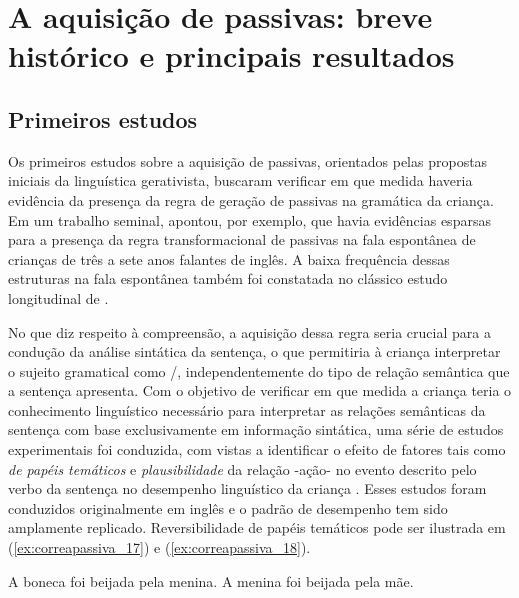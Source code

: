 \documentclass[output=paper]{LSP/langsci}
\begin{document}
\section{A aquisição de passivas: breve histórico e principais resultados}
\label{sec:correapassiva_breve_historia}
\subsection{Primeiros estudos}
\label{subsec:correapassiva_primeiros_estudos}

Os primeiros estudos sobre a aquisição de passivas, orientados pelas propostas iniciais da linguística gerativista, buscaram verificar em que medida haveria evidência da presença da regra de geração de passivas na gramática da criança. Em um trabalho seminal, \citet{menyuk1969} apontou, por exemplo, que havia evidências esparsas para a presença da regra transformacional de passivas na fala espontânea de crianças de três a sete anos falantes de inglês. A baixa frequência dessas estruturas na fala espontânea também foi constatada no clássico estudo longitudinal de \citet{brown1973}. 

No que diz respeito à compreensão, a aquisição dessa regra seria crucial para a condução da análise sintática da sentença, o que permitiria à criança interpretar o sujeito gramatical como /, independentemente do tipo de relação semântica que a sentença apresenta. Com o objetivo de verificar em que medida a criança teria o conhecimento linguístico necessário para interpretar as relações semânticas da sentença com base exclusivamente em informação sintática, uma série de estudos experimentais foi conduzida, com vistas a identificar o efeito de fatores tais como \textit{ de papéis temáticos} e \textit{plausibilidade} da relação -ação- no evento descrito pelo verbo da sentença no desempenho linguístico da criança \citep{bever1970,strohnernelson1974}. Esses estudos foram conduzidos originalmente em inglês e o padrão de desempenho tem sido amplamente replicado. Reversibilidade de papéis temáticos pode ser ilustrada em (\ref{ex:correapassiva_17}) e (\ref{ex:correapassiva_18}).

\ea\label{ex:correapassiva_17} A boneca foi beijada pela menina.
\z
\ea\label{ex:correapassiva_18} A menina foi beijada pela mãe.
\z
\end{document}
